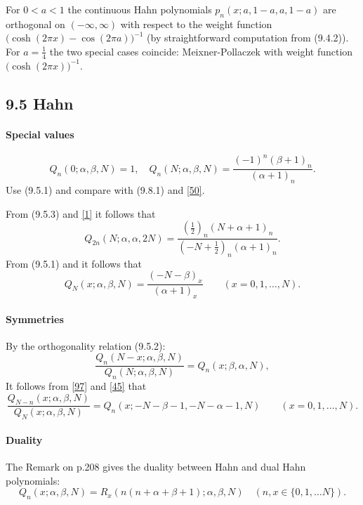 \documentclass[twoside,11pt]{article}
\newcommand\al\alpha
\newcommand\be\beta
\newcommand\thalf{\tfrac12}
\newcommand\iy\infty
\begin{document}
For $0<a<1$ the continuous Hahn polynomials $p_n(x;a,1-a,a,1-a)$
are orthogonal on $(-\iy,\iy)$ with respect to the weight function
$\big(\cosh(2\pi x)-\cos(2\pi a)\big)^{-1}$
(by straightforward computation from (9.4.2)).
For $a=\tfrac14$ the two special cases coincide:
Meixner-Pollaczek with weight function $\big(\cosh(2\pi x)\big)^{-1}$.
%
\subsection*{9.5 Hahn}
\label{sec9.5}
%
\paragraph{Special values}
\begin{equation}
Q_n(0;\al,\be,N)=1,\quad
Q_n(N;\al,\be,N)=\frac{(-1)^n(\be+1)_n}{(\al+1)_n} .
\label{95}
\end{equation}
Use (9.5.1) and compare with (9.8.1) and \eqref{50}.

From (9.5.3) and \eqref{1} it follows that
\begin{equation}
Q_{2n}(N;\al,\al,2N)=\frac{(\thalf)_n(N+\al+1)_n}{(-N+\thalf)_n(\al+1)_n} .
\label{30}
\end{equation}
From (9.5.1) and  it follows that
\begin{equation}
Q_N(x;\al,\be,N)=\frac{(-N-\be)_x}{(\al+1)_x}\qquad(x=0,1,\ldots,N).
\label{44}
\end{equation}
%
\paragraph{Symmetries}
By the orthogonality relation (9.5.2):
\begin{equation}
\frac{Q_n(N-x;\al,\be,N)}{Q_n(N;\al,\be,N)}=Q_n(x;\be,\al,N),
\label{96}
\end{equation}
It follows from \eqref{97} and \eqref{45} that
\begin{equation}
\frac{Q_{N-n}(x;\al,\be,N)}{Q_N(x;\al,\be,N)}
=Q_n(x;-N-\be-1,-N-\al-1,N)
\qquad(x=0,1,\ldots,N).
\label{100}
\end{equation}
%
\paragraph{Duality}
The Remark on p.208 gives the duality between Hahn and dual Hahn polynomials:
%
\begin{equation}
Q_n(x;\al,\be,N)=R_x(n(n+\al+\be+1);\al,\be,N)\quad(n,x\in\{0,1,\ldots N\}).
\label{45}
\end{equation}
%
\end{document}
